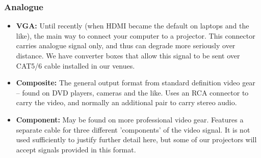 \documentclass[14pt]{article} %
\begin{document}
\subsubsection{Analogue}
\begin{itemize}
\item \textbf{VGA: } Until recently (when HDMI became the default on laptops and the like), the main way to connect your computer to a projector. This connector carries analogue signal only, and thus can degrade more seriously over distance. We have converter boxes that allow this signal to be sent over CAT5/6 cable installed in our venues.
\item \textbf{Composite: } The general output format from standard definition video gear -- found on DVD players, cameras and the like. Uses an RCA connector to carry the video, and normally an additional pair to carry stereo audio.
\item \textbf{Component: } May be found on more professional video gear. Features a separate cable for three different 'components' of the video signal. It is not used sufficiently to justify further detail here, but some of our projectors will accept signals provided in this format.
\end{itemize}


%

 
\end{document}
